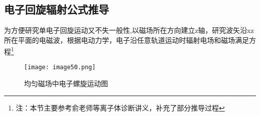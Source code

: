 
\chapter{}
\section{电子回旋辐射公式推导}
\label{sec:A1}
为方便研究单电子回旋运动又不失一般性,以磁场所在方向建立z轴，研究波矢沿xz所在平面的电磁波，根据电动力学，电子沿任意轨道运动时辐射电场和磁场满足方程\footnote{注：本节主要参考俞老师等离子体诊断讲义，补充了部分推导过程}
\begin{figure}[ht]
\centering
\texttt{[image: image50.png]}
\caption{\label{fig:elecorb2}均匀磁场中电子螺旋运动图}
\end{figure}

